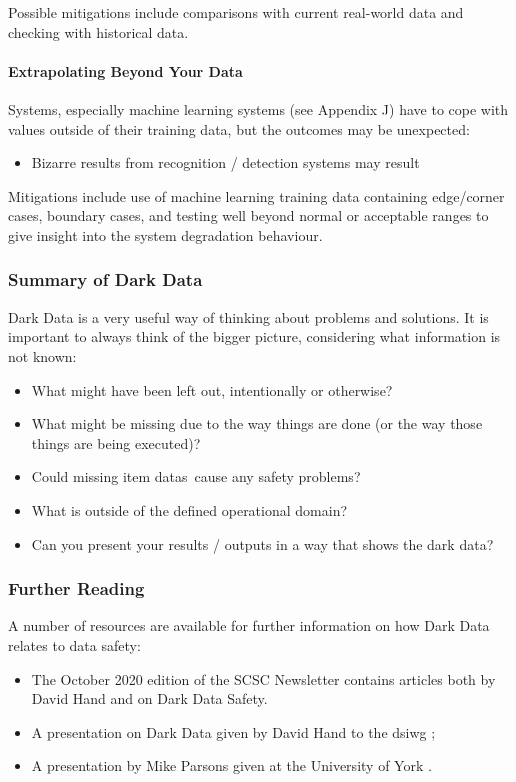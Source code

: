 Possible mitigations include comparisons with current real-world data and checking with historical data.

\paragraph{Extrapolating Beyond Your Data}\label{bkm:dark15}
Systems, especially machine learning systems (see Appendix J) have to cope with values outside of their training data, but the outcomes may be unexpected:
\begin{itemize}
\item Bizarre results from recognition / detection systems may result
\end{itemize}

Mitigations include use of machine learning training data containing edge/corner cases, boundary cases, and testing well beyond normal or acceptable ranges to give insight into the system degradation behaviour.
\subsubsection{Summary of Dark Data}
Dark Data is a very useful way of thinking about problems and solutions. It is important to always think of the bigger picture, considering what \gls{information} is not known:

\begin{itemize}
  \item What might have been left out, intentionally or otherwise?
  \item What might be missing due to the way things are done (or the way those things are being executed)?
  \item Could missing \cbstart\glspl{item data}\cbend\ cause any safety problems?
  \item What is outside of the defined operational domain?
  \item Can you present your results / outputs in a way that shows the dark data?
\end{itemize}

\subsubsection{Further Reading}
A number of resources are available for further \gls{information} on how Dark Data relates to data safety:
\begin{itemize}
\item The October 2020 edition of the SCSC Newsletter \cite{citation:SCSC160} contains articles both by David Hand and on Dark Data Safety.
  \item A presentation on Dark Data given by David Hand to the \gls{dsiwg} \cite{citation:darkdata:presentation1};
  \item A presentation by Mike Parsons given at the University of York \cite{citation:darkdata:presentation2}.
\end{itemize}
%
%
%
%
